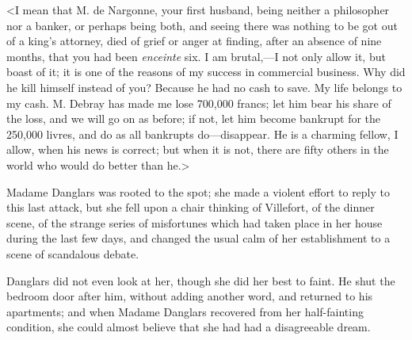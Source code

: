  <I mean that M. de Nargonne, your first husband, being neither a philosopher nor a banker, or perhaps being both, and seeing there was nothing to be got out of a king's attorney, died of grief or anger at finding, after an absence of nine months, that you had been \textit{enceinte} six. I am brutal,—I not only allow it, but boast of it; it is one of the reasons of my success in commercial business. Why did he kill himself instead of you? Because he had no cash to save. My life belongs to my cash. M. Debray has made me lose 700,000 francs; let him bear his share of the loss, and we will go on as before; if not, let him become bankrupt for the 250,000 livres, and do as all bankrupts do—disappear. He is a charming fellow, I allow, when his news is correct; but when it is not, there are fifty others in the world who would do better than he.> 

 Madame Danglars was rooted to the spot; she made a violent effort to reply to this last attack, but she fell upon a chair thinking of Villefort, of the dinner scene, of the strange series of misfortunes which had taken place in her house during the last few days, and changed the usual calm of her establishment to a scene of scandalous debate. 

 Danglars did not even look at her, though she did her best to faint. He shut the bedroom door after him, without adding another word, and returned to his apartments; and when Madame Danglars recovered from her half-fainting condition, she could almost believe that she had had a disagreeable dream. 